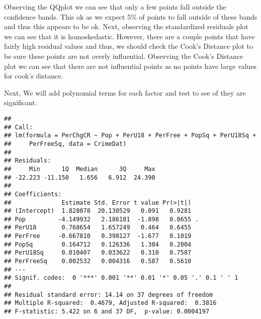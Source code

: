 \documentclass[]{article}
\newenvironment{Shaded}{\begin{snugshade}}{\end{snugshade}}
\newcommand{\KeywordTok}[1]{\textcolor[rgb]{0.13,0.29,0.53}{\textbf{#1}}}
\newcommand{\DataTypeTok}[1]{\textcolor[rgb]{0.13,0.29,0.53}{#1}}
\newcommand{\DecValTok}[1]{\textcolor[rgb]{0.00,0.00,0.81}{#1}}
\newcommand{\StringTok}[1]{\textcolor[rgb]{0.31,0.60,0.02}{#1}}
\newcommand{\OperatorTok}[1]{\textcolor[rgb]{0.81,0.36,0.00}{\textbf{#1}}}
\newcommand{\NormalTok}[1]{#1}
\begin{document}
Observing the QQplot we can see that only a few points fall outside the
confidence bands. This ok as we expect 5\% of points to fall outside of
these bands and thus this appears to be ok. Next, observing the
standardized residuals plot we can see that it is homoskedastic.
However, there are a couple points that have fairly high residual values
and thus, we should check the Cook's Distance plot to be sure these
points are not overly influential. Observing the Cook's Distance plot we
can see that there are not influential points as no points have large
values for cook's distance.

Next, We will add polynomial terms for each factor and test to see of
they are significant.

\begin{Shaded}
\end{Shaded}

\begin{verbatim}
## 
## Call:
## lm(formula = PerChgCR ~ Pop + PerU18 + PerFree + PopSq + PerU18Sq + 
##     PerFreeSq, data = CrimeDat)
## 
## Residuals:
##     Min      1Q  Median      3Q     Max 
## -22.223 -11.150   1.656   6.912  24.390 
## 
## Coefficients:
##              Estimate Std. Error t value Pr(>|t|)  
## (Intercept)  1.828078  20.130529   0.091   0.9281  
## Pop         -4.149932   2.186101  -1.898   0.0655 .
## PerU18       0.768654   1.657249   0.464   0.6455  
## PerFree     -0.667810   0.398127  -1.677   0.1019  
## PopSq        0.164712   0.126336   1.304   0.2004  
## PerU18Sq     0.010407   0.033622   0.310   0.7587  
## PerFreeSq    0.002532   0.004316   0.587   0.5610  
## ---
## Signif. codes:  0 '***' 0.001 '**' 0.01 '*' 0.05 '.' 0.1 ' ' 1
## 
## Residual standard error: 14.14 on 37 degrees of freedom
## Multiple R-squared:  0.4679, Adjusted R-squared:  0.3816 
## F-statistic: 5.422 on 6 and 37 DF,  p-value: 0.0004197
\end{verbatim}
\end{document}
